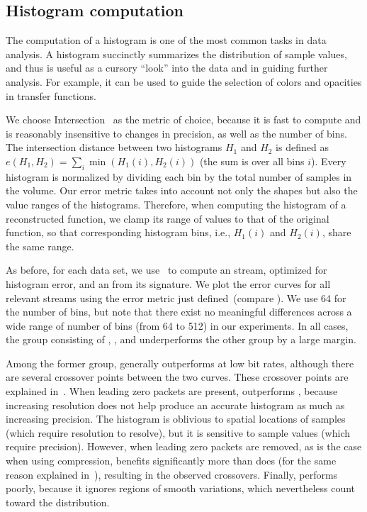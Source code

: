 \subsection{Histogram computation}\label{sec:histogram}

The computation of a histogram is one of the most common tasks in data analysis. A histogram
succinctly summarizes the distribution of sample values, and thus is useful as a cursory ``look''
into the data and in guiding further analysis. For example, it can be used to guide the selection of
colors and opacities in transfer functions.

We choose Intersection~\cite{histogram_intersection1991} as the metric of choice, because it is fast
to compute and is reasonably insensitive to changes in precision, as well as the number of bins. The
intersection distance between two histograms $H_1$ and $H_2$ is defined as
$e(H_1,H_2)=\sum_{i}{\min{(H_1(i),H_2(i))}}$ (the sum is over all bins $i$). Every histogram is
normalized by dividing each bin by the total number of samples in the volume. Our error metric takes
into account not only the shapes but also the value ranges of the histograms. Therefore, when
computing the histogram of a reconstructed function, we clamp its range of values to that of the
original function, so that corresponding histogram bins, i.e., $H_1(i)$ and $H_2(i)$, share the same
range.

As before, for each data set, we use~ to compute an \shop stream, optimized for
histogram error, and an \shsg from its signature. We plot the error curves for all relevant
streams using the error metric just defined~(compare ). We use
64 for the number of bins, but note that there exist no meaningful differences across a wide range
of number of bins (from 64 to 512) in our experiments. In all cases, the group consisting of
\sbit, \slvl, and \smag underperforms the other group by a large margin.

Among the former group, \slvl generally outperforms \sbit at low bit rates, although there are
several crossover points between the two curves. These crossover points are explained
in~. When leading zero packets are present, \slvl outperforms
\sbit, because increasing resolution does not help produce an accurate histogram as much as
increasing precision. The histogram is oblivious to spatial locations of samples (which require
resolution to resolve), but it is sensitive to sample values (which require precision). However,
when leading zero packets are removed, as is the case when using compression, \sbit benefits
significantly more than \slvl does (for the same reason explained in~),
resulting in the observed crossovers. Finally, \smag performs poorly, because it ignores regions
of smooth variations, which nevertheless count toward the distribution.

